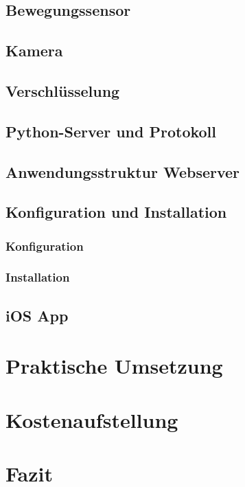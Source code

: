 \section{Bewegungssensor} 
\section{Kamera}
\section{Verschlüsselung}
\section{Python-Server und Protokoll} 
\section{Anwendungsstruktur Webserver}
\section{Konfiguration und Installation}
\subsection{Konfiguration}
\subsection{Installation}

\section{iOS App}


\chapter{Praktische Umsetzung}

\chapter{Kostenaufstellung}

\chapter{Fazit}



 

 